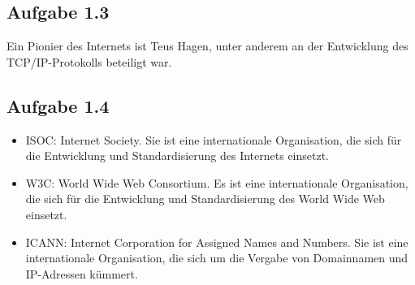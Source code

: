 \documentclass[11pt]{article}
\begin{document}
\subsection{Aufgabe 1.3}
Ein Pionier des Internets ist Teus Hagen, unter anderem an der Entwicklung des TCP/IP-Protokolls beteiligt
war.

\subsection{Aufgabe 1.4}
\begin{itemize}
  \item ISOC: Internet Society. Sie ist eine internationale Organisation, die sich für die Entwicklung und
        Standardisierung des Internets einsetzt.
  \item W3C: World Wide Web Consortium. Es ist eine internationale Organisation, die sich für die Entwicklung und 
  Standardisierung des World Wide Web einsetzt.
  \item ICANN: Internet Corporation for Assigned Names and Numbers. Sie ist eine internationale Organisation, die sich 
  um die Vergabe von Domainnamen und IP-Adressen kümmert.
\end{itemize}
\end{document}
